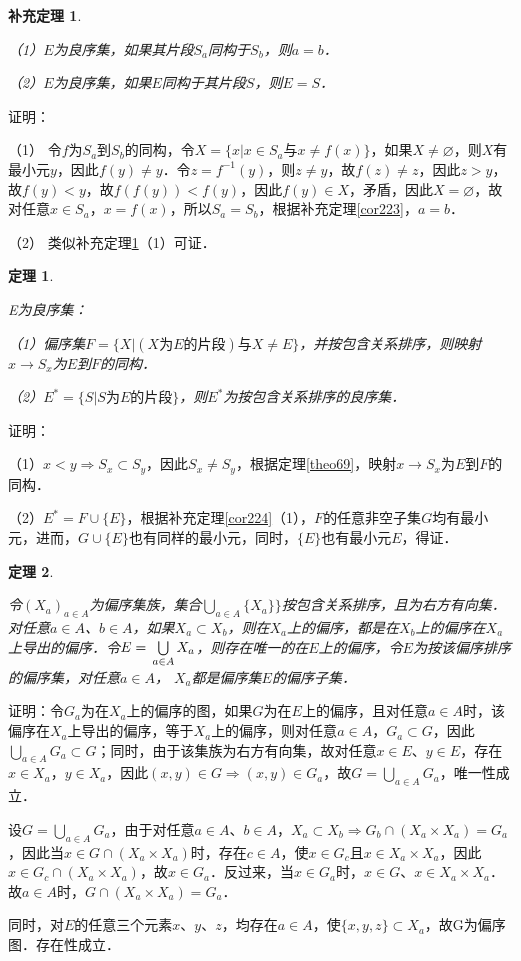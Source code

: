 \documentclass[12pt, a4paper, oneside]{book}
\newtheorem{theo}{定理}
\newtheorem{cor}{补充定理}
\begin{document}
			\begin{cor}\label{cor225}
				\hfill\par
				（1）$E$为良序集，如果其片段$S_a$同构于$S_b$，则$a=b$．
				\par
				（2）$E$为良序集，如果$E$同构于其片段$S$，则$E=S$．
			\end{cor}
			证明：
			\par
			（1）	令$f$为$S_a$到$S_b$的同构，令$X=\{x|x\in S_a\text{与}x\neq f(x)\}$，如果$X\neq \varnothing$，则$X$有最小元$y$，因此$f(y)\neq y$．令$z=f^{-1}(y)$，则$z\neq y$，故$f(z)\neq z$，因此$z>y$，故$f(y)<y$，故$f(f(y))<f(y)$，因此$f(y)\in X$，矛盾，因此$X=\varnothing$，故对任意$x\in S_a$，$x=f(x)$，所以$S_a=S_b$，根据补充定理\ref{cor223}，$a=b$．
			\par
			（2）	类似补充定理\ref{cor225}（1）可证．
			
			\begin{theo}\label{theo73}
				\hfill\par
				E为良序集：
				\par
				（1）偏序集$F=\{X|(X\text{为}E\text{的片段})\text{与}X\neq E\}$，并按包含关系排序，则映射$x\to S_x$为$E$到$F$的同构．
				\par
				（2）$E^*=\{S|S\text{为}E\text{的片段}\}$，则$E^*$为按包含关系排序的良序集．
			\end{theo}
			证明：
			\par
			（1）$x<y\Rightarrow S_x\subset S_y$，因此$S_x\neq S_y$，根据定理\ref{theo69}，映射$x\to S_x$为$E$到$F$的同构．
			\par
			（2）$E^*=F\cup\{E\}$，根据补充定理\ref{cor224}（1），$F$的任意非空子集$G$均有最小元，进而，$G\cup\{E\}$也有同样的最小元，同时，$\{E\}$也有最小元$E$，得证．
						
			\begin{theo}\label{theo74}
				\hfill\par
				令$(X_a)_{a\in A}$为偏序集族，集合$\bigcup\limits_{a\in A}\{X_a\}\}$按包含关系排序，且为右方有向集．对任意$a\in A$、$b\in A$，如果$X_a\subset X_b$，则在$X_a$上的偏序，都是在$X_b$上的偏序在$X_a$上导出的偏序．令$E=\\\bigcup\limits_{a\in A}X_a$，则存在唯一的在$E$上的偏序，令$E$为按该偏序排序的偏序集，对任意$a\in A$， $X_a$都是偏序集$E$的偏序子集．
			\end{theo}
			证明：令$G_a$为在$X_a$上的偏序的图，如果$G$为在$E$上的偏序，且对任意$a\in A$时，该偏序在$X_a$上导出的偏序，等于$X_a$上的偏序，则对任意$a\in A$，$G_a\subset G$，因此$\bigcup\limits_{a\in A}G_a\subset G$；同时，由于该集族为右方有向集，故对任意$x\in E$、$y\in E$，存在$x\in X_a$，$y\in X_a$，因此$(x, y)\in G\Rightarrow (x, y)\in G_a$，故$G=\bigcup\limits_{a\in A}G_a$，唯一性成立．
			\par
			设$G=\bigcup\limits_{a\in A}G_a$，由于对任意$a\in A$、$b\in A$，$X_a\subset X_b\Rightarrow G_b\cap (X_a\times X_a)=G_a$，因此当$x\in G\cap(X_a\times X_a)$时，存在$c\in A$，使$x\in G_c$且$x\in X_a\times X_a$，因此$x\in G_c\cap(X_a\times X_a)$，故$x\in G_a$．反过来，当$x\in G_a$时，$x\in G$、$x\in X_a\times X_a$．故$a\in A$时，$G\cap(X_a\times X_a)=G_a$．
			\par
			同时，对$E$的任意三个元素$x$、$y$、$z$，均存在$a\in A$，使$\{x, y, z\}\subset X_a$，故G为偏序图．存在性成立．
						
\end{document}
